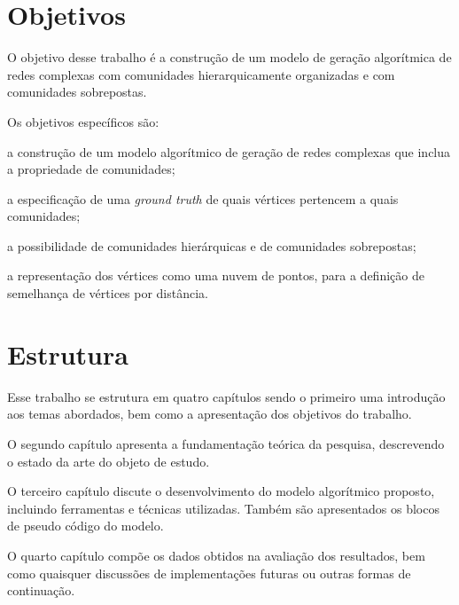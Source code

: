 \documentclass[notes.tex]{subfiles}
\begin{document}
\section{Objetivos}

O objetivo desse trabalho é a construção de um modelo de geração algorítmica de redes complexas com comunidades hierarquicamente organizadas e com comunidades sobrepostas.

Os objetivos específicos são:

\begin{alineas}
    \item a construção de um modelo algorítmico de geração de redes complexas que inclua a propriedade de comunidades;
    \item a especificação de uma \emph{ground truth} de quais vértices pertencem a quais comunidades;
    \item a possibilidade de comunidades hierárquicas e de comunidades sobrepostas;
    \item a representação dos vértices como uma nuvem de pontos, para a definição de semelhança de vértices por distância.
\end{alineas}

\section{Estrutura}

Esse trabalho se estrutura em quatro capítulos sendo o primeiro uma introdução aos temas abordados, bem como a apresentação dos objetivos do trabalho.

O segundo capítulo apresenta a fundamentação teórica da pesquisa, descrevendo o estado da arte do objeto de estudo.

O terceiro capítulo discute o desenvolvimento do modelo algorítmico proposto, incluindo ferramentas e técnicas utilizadas.
Também são apresentados os blocos de pseudo código do modelo.

O quarto capítulo compõe os dados obtidos na avaliação dos resultados, bem como quaisquer discussões de implementações futuras ou outras formas de continuação.
\end{document}
